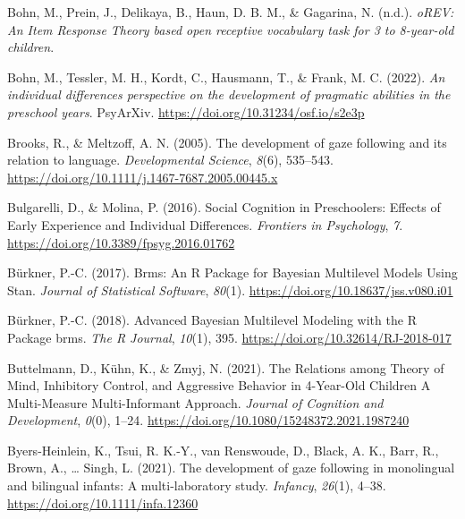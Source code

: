 \documentclass[
  man,floatsintext]{apa6}
\newlength{\cslhangindent}
\newlength{\cslentryspacingunit} %
\newenvironment{CSLReferences}[2] %
 {%
  \setlength{\parindent}{0pt}
  \ifodd #1
  \let\oldpar\par
  \def\par{\hangindent=\cslhangindent\oldpar}
  \fi
  \setlength{\parskip}{#2\cslentryspacingunit}
 }%
 {}
\begin{document}
\begin{CSLReferences}{1}{0}
\leavevmode{}%
Bohn, M., Prein, J., Delikaya, B., Haun, D. B. M., \& Gagarina, N. (n.d.). \emph{{oREV}: An {Item Response Theory} based open receptive vocabulary task for 3 to 8-year-old children}.

\leavevmode{}%
Bohn, M., Tessler, M. H., Kordt, C., Hausmann, T., \& Frank, M. C. (2022). \emph{An individual differences perspective on the development of pragmatic abilities in the preschool years}. {PsyArXiv}. \url{https://doi.org/10.31234/osf.io/s2e3p}

\leavevmode{}%
Brooks, R., \& Meltzoff, A. N. (2005). The development of gaze following and its relation to language. \emph{Developmental Science}, \emph{8}(6), 535--543. \url{https://doi.org/10.1111/j.1467-7687.2005.00445.x}

\leavevmode{}%
Bulgarelli, D., \& Molina, P. (2016). Social {Cognition} in {Preschoolers}: {Effects} of {Early Experience} and {Individual Differences}. \emph{Frontiers in Psychology}, \emph{7}. \url{https://doi.org/10.3389/fpsyg.2016.01762}

\leavevmode{}%
Bürkner, P.-C. (2017). Brms: {An R Package} for {Bayesian Multilevel Models Using Stan}. \emph{Journal of Statistical Software}, \emph{80}(1). \url{https://doi.org/10.18637/jss.v080.i01}

\leavevmode{}%
Bürkner, P.-C. (2018). Advanced {Bayesian Multilevel Modeling} with the {R Package} brms. \emph{The R Journal}, \emph{10}(1), 395. \url{https://doi.org/10.32614/RJ-2018-017}

\leavevmode{}%
Buttelmann, D., Kühn, K., \& Zmyj, N. (2021). The {Relations} among {Theory} of {Mind}, {Inhibitory Control}, and {Aggressive Behavior} in 4-{Year-Old Children} \textendash{} {A Multi-Measure Multi-Informant Approach}. \emph{Journal of Cognition and Development}, \emph{0}(0), 1--24. \url{https://doi.org/10.1080/15248372.2021.1987240}

\leavevmode{}%
Byers-Heinlein, K., Tsui, R. K.-Y., van Renswoude, D., Black, A. K., Barr, R., Brown, A., \ldots{} Singh, L. (2021). The development of gaze following in monolingual and bilingual infants: {A} multi-laboratory study. \emph{Infancy}, \emph{26}(1), 4--38. \url{https://doi.org/10.1111/infa.12360}


\end{CSLReferences}
\end{document}

